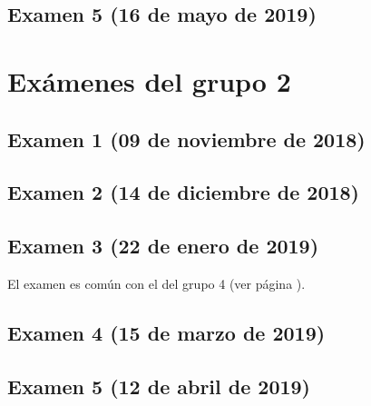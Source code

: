 \documentclass[a4paper,12pt,twoside]{book}
\begin{document}
\section{Examen 5 (16 de mayo de 2019)}

\chapter{Exámenes del grupo 2}
\section{Examen 1 (09 de noviembre de 2018)}
\section{Examen 2 (14 de diciembre de 2018)}
\section{Examen 3 (22 de enero de 2019)}
El examen es común con el del grupo 4 (ver página \pageref{examen_18_19_4_3}).
\section{Examen 4 (15 de marzo de 2019)}
\section{Examen 5 (12 de abril de 2019)}
\end{document}
